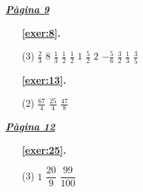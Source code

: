 \hyperlink{page.9}{\textbf{\em Pàgina 9}}
\begin{enumerate}



 \item[\fontfamily{phv}\selectfont\color{blue}\textbf{\ref{exer:8}. }] \label{ans:8}
 \begin{tasks}[column-sep=1em, item-indent=1.3333em](3)
	 \task $\frac {2}{3}$
	 \task $8$
	 \task $\frac {1}{3}$
	 \task $\frac {1}{2}$
	 \task $\frac {1}{2}$
	 \task $1$
	 \task $\frac {5}{2}$
	 \task $2$
	 \task $-\frac {5}{6}$
	 \task $\frac {3}{2}$
	 \task $\frac {1}{3}$
	 \task $\frac {3}{5}$
\end{tasks}
 \end{enumerate}
\begin{enumerate}



 \item[\fontfamily{phv}\selectfont\color{blue}\textbf{\ref{exer:13}. }] \label{ans:13}
 \begin{tasks}[column-sep=1em, item-indent=1.3333em](2)
	 \task $\frac {67}{4}$
	 \task $\frac {25}{4}$
	 \task $\frac {47}{8}$
\end{tasks}
 \end{enumerate}
\vspace{0.3cm}


\hyperlink{page.12}{\textbf{\em Pàgina 12}}
\begin{enumerate}



 \item[\fontfamily{phv}\selectfont\color{blue}\textbf{\ref{exer:25}. }] \label{ans:25}
 \begin{tasks}[column-sep=1em, item-indent=1.3333em](3)
	 \task $1$
	 \task $\dfrac {20}{9}$
	 \task $\dfrac {99}{100}$
\end{tasks}
 \end{enumerate}
\vspace{0.3cm}


